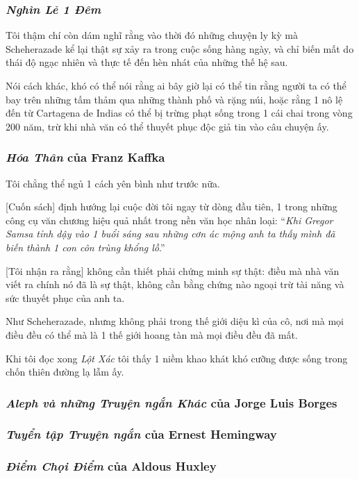 \documentclass{article}
\begin{document}
\subsubsection{\textit{Nghìn Lẻ 1 Đêm}}
Tôi thậm chí còn dám nghĩ rằng vào thời đó những chuyện ly kỳ mà Scheherazade kể lại thật sự xảy ra trong cuộc sống hàng ngày, và chỉ biến mất do thái độ ngạc nhiên và thực tế đến hèn nhát của những thế hệ sau.

Nói cách khác, khó có thể nói rằng ai bây giờ lại có thể tin rằng người ta có thể bay trên những tấm thảm qua những thành phố và rặng núi, hoặc rằng 1 nô lệ đến từ Cartagena de Indias có thể bị trừng phạt sống trong 1 cái chai trong vòng 200 năm, trừ khi nhà văn có thể thuyết phục độc giả tin vào câu chuyện ấy.

\subsubsection{\textit{Hóa Thân} của Franz Kaffka}
Tôi chẳng thể ngủ 1 cách yên bình như trước nữa.

[Cuốn sách] định hướng lại cuộc đời tôi ngay từ dòng đầu tiên, 1 trong những công cụ văn chương hiệu quả nhất trong nền văn học nhân loại: ``\textit{Khi Gregor Samsa tỉnh dậy vào 1 buổi sáng sau những cơn ác mộng anh ta thấy mình đã biến thành 1 con côn trùng khổng lồ}.''

[Tôi nhận ra rằng] không cần thiết phải chứng minh sự thật: điều mà nhà văn viết ra chính nó đã là sự thật, không cần bằng chứng nào ngoại trừ tài năng và sức thuyết phục của anh ta.

Như Scheherazade, nhưng không phải trong thế giới diệu kì của cô, nơi mà mọi điều đều có thể mà là 1 thế giới hoang tàn mà mọi điều đều đã mất.

Khi tôi đọc xong \textit{Lột Xác} tôi thấy 1 niềm khao khát khó cưỡng được sống trong chốn thiên đường lạ lẫm ấy.

\subsubsection{\textit{Aleph và những Truyện ngắn Khác} của Jorge Luis Borges}

\subsubsection{\textit{Tuyển tập Truyện ngắn} của Ernest Hemingway}

\subsubsection{\textit{Điểm Chọi Điểm} của Aldous Huxley}
\end{document}
